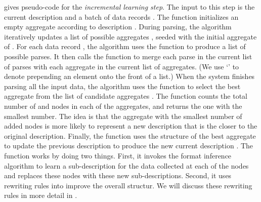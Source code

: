  gives pseudo-code for the {\em incremental
  learning step}.  The input to this step is the current description
 and a batch of data records .  The 
function initializes an empty aggregate according to description
.  During parsing, the algorithm iteratively updates a list of
possible aggregates , seeded with the initial aggregate of
.  For each data record , the algorithm uses the
 function to produce a list  of possible parses.  It
then calls the  function to merge each parse  in
the current list of parses with each aggregate  in the current
list of aggregates.  (We use `\cd{::}' to denote prepending an element
onto the front of a list.)  When the system finishes parsing all the
input data, the algorithm uses the  function to
select the best aggregate from the list of candidate aggregates
.  The  function counts the total number of
 and  nodes in each of the aggregates, and returns
the one with the smallest number.
The idea is that the aggregate with the smallest number of added nodes is 
more likely to represent a new description
that is the closer to the original description. 
Finally, the  function uses the structure of the best
aggregate to update the previous description  to produce the new
current description .  The  function works by
doing two things.
First, it invokes the format inference
algorithm to learn a sub-description for the data collected 
at each of the  nodes
and replaces these  nodes with these new sub-descriptions. 
Second, it uses rewriting
rules into improve the overall structur.
We will discuss these rewriting rules in more
detail in .

